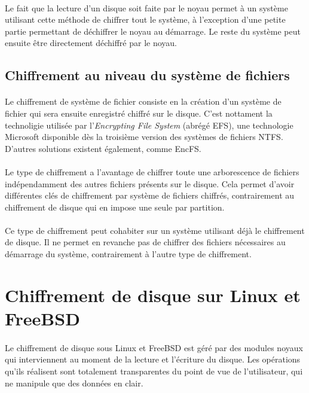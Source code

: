 \paragraph{}
Le fait que la lecture d'un disque soit faite par le noyau permet à un système
utilisant cette méthode de chiffrer tout le système, à l'exception d'une petite
partie permettant de déchiffrer le noyau au démarrage. Le reste du système peut
ensuite être directement déchiffré par le noyau.

\subsection{Chiffrement au niveau du système de fichiers}
\paragraph{}
Le chiffrement de système de fichier consiste en la création d'un système de
fichier qui sera ensuite enregistré chiffré sur le disque. C'est nottament la
technoligie utilisée par l'\textit{Encrypting File System} (abrégé EFS), une
technologie Microsoft disponible dès la troisième version des systèmes de
fichiers NTFS. D'autres solutions existent également, comme EncFS.
\paragraph{}
Le type de chiffrement a l'avantage de chiffrer toute une arborescence de
fichiers indépendamment des autres fichiers présents sur le disque. Cela permet
d'avoir différentes clés de chiffrement par système de fichiers chiffrés,
contrairement au chiffrement de disque qui en impose une seule par partition.
\paragraph{}
Ce type de chiffrement peut cohabiter sur un système utilisant déjà le
chiffrement de disque. Il ne permet en revanche pas de chiffrer des fichiers
nécessaires au démarrage du système, contrairement à l'autre type de
chiffrement.

\section{Chiffrement de disque sur Linux et FreeBSD}
\paragraph{}
Le chiffrement de disque sous Linux et FreeBSD est géré par des modules noyaux
qui interviennent au moment de la lecture et l'écriture du disque. Les
opérations qu'ils réalisent sont totalement transparentes du point de vue de
l'utilisateur, qui ne manipule que des données en clair.
